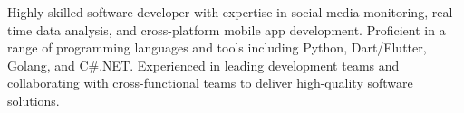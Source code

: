 \newline
\newline
\begin{cvparagraph}
Highly skilled software developer with expertise in social media
monitoring, real-time data analysis, and cross-platform mobile app
development. Proficient in a range of programming languages and
tools including Python, Dart/Flutter, Golang, and C\#.NET. Experienced in
leading development teams and collaborating with cross-functional
teams to deliver high-quality software solutions.
\end{cvparagraph}
